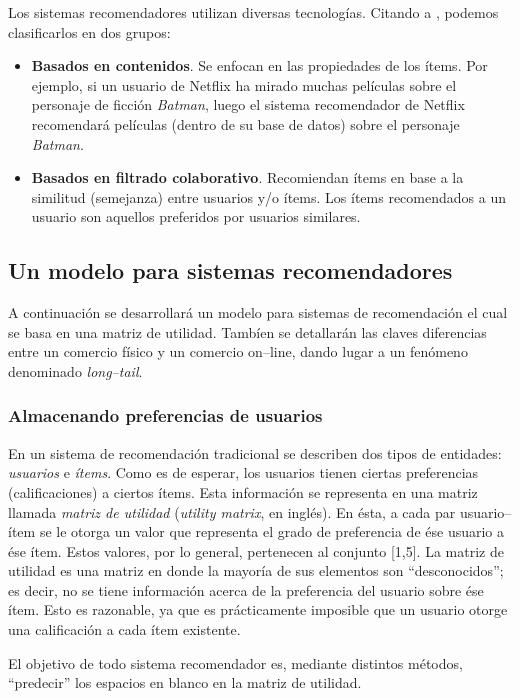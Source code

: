 		Los sistemas recomendadores utilizan diversas tecnologías. Citando a \cite{ullman2014}, podemos clasificarlos en dos grupos:
		\begin{itemize}
			\item \textbf{Basados en contenidos}. Se enfocan en las propiedades de los ítems. Por ejemplo, si un usuario de Netflix ha mirado muchas películas sobre el personaje de ficción \textit{Batman}, luego el sistema recomendador de Netflix recomendará películas (dentro de su base de datos) sobre el personaje \textit{Batman}.
			\item \textbf{Basados en filtrado colaborativo}. Recomiendan ítems en base a la similitud (semejanza) entre usuarios y/o ítems. Los ítems recomendados a un usuario son aquellos preferidos por usuarios similares.
		\end{itemize}
	
	\subsection{Un modelo para sistemas recomendadores}
		A continuación se desarrollará un modelo para sistemas de recomendación el cual se basa en una matriz de utilidad. Tambíen se detallarán las claves diferencias entre un comercio físico y un comercio on--line, dando lugar a un fenómeno denominado \textit{long--tail}.
		
		\subsubsection{Almacenando preferencias de usuarios}
			En un sistema de recomendación tradicional se describen dos tipos de entidades: \textit{usuarios} e \textit{ítems}. Como es de esperar, los usuarios tienen ciertas preferencias (calificaciones) a ciertos ítems. Esta información se representa en una matriz llamada \textit{matriz de utilidad} (\textit{utility matrix}, en inglés). En ésta, a cada par usuario--ítem se le otorga un valor que representa el grado de preferencia de ése usuario a ése ítem. Estos valores, por lo general, pertenecen al conjunto [1,5]. La matriz de utilidad es una matriz en donde la mayoría de sus elementos son \enquote{desconocidos}; es decir, no se tiene información acerca de la preferencia del usuario sobre ése ítem. Esto es razonable, ya que es prácticamente imposible que un usuario otorge una calificación a cada ítem existente. \par
			El objetivo de todo sistema recomendador es, mediante distintos métodos, \enquote{predecir} los espacios en blanco en la matriz de utilidad. \par
			

